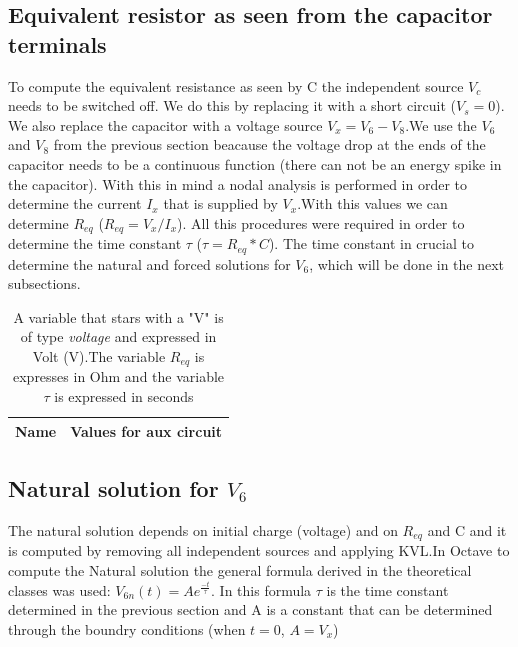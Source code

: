\subsection{Equivalent resistor as seen from the capacitor terminals}

To compute the equivalent resistance as seen by C the independent source $V_c$ needs to be switched off. We do this by replacing it with a short circuit ($V_s=0$). We also replace the capacitor with a voltage source $V_x=V_6-V_8$.We use the $V_6$ and $V_8$ from the previous section beacause the voltage drop at the ends of the capacitor needs to be a continuous function (there can not be an energy spike in the capacitor). With this in mind a nodal analysis is performed in order to determine the current $I_x$ that is supplied by $V_x$.With this values we can determine $R_{eq}$ ($R_{eq}=V_x/I_x$). All this procedures were required in order to determine the time constant $\tau$ ($\tau=R_{eq}*C$). The time constant in crucial to determine the natural and forced solutions for $V_6$, which will be done in the next subsections. 

\begin{table}[h!]
  \centering
  \begin{tabular}{|l|r|}
    \hline    
    {\bf Name} & {\bf Values for aux circuit}\\ \hline
    
  \end{tabular}
  \caption{A variable that stars with a "V" is of type {\it voltage} and expressed in
    Volt (V).The variable $R_{eq}$ is expresses in Ohm and the variable $\tau$ is expressed in seconds }
  \label{tab:equivalent resistor}
\end{table}
\vspace{10cm}
\pagebreak

\subsection{Natural solution for $V_6$}

The natural solution depends on initial charge (voltage) and on $R_{eq}$ and C and it is computed by removing all independent sources and applying KVL.In Octave to compute the Natural solution the general formula derived in the theoretical classes was used: $V_{6n}(t)=Ae^{\frac{-t}{\tau}}$. In this formula $\tau$ is the time constant determined in the previous section and  A is a constant that can be determined through the boundry conditions (when $t=0$, $A=V_x$)

